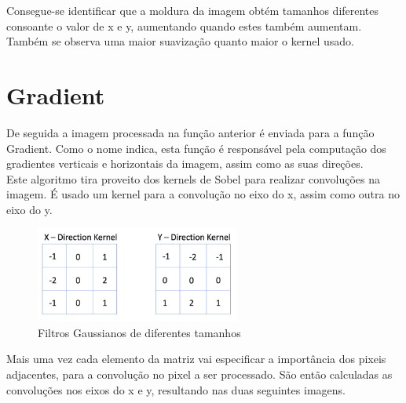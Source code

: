 \documentclass[a4paper]{report}
\begin{document}
Consegue-se identificar que a moldura da imagem obtém tamanhos diferentes consoante o valor de x e y, aumentando quando estes também aumentam. Também se observa uma maior suavização quanto maior o kernel usado.


\section{Gradient}
De seguida a imagem processada na função anterior é enviada para a função Gradient. Como o nome
indica, esta função é responsável pela computação dos gradientes verticais e horizontais da imagem,
assim como as suas direções.\\

Este algoritmo tira proveito dos kernels de Sobel para realizar convoluções na imagem. É usado um
kernel para a convolução no eixo do x, assim como outra no eixo do y.

\begin{figure}[H]
    \centering
        \includegraphics[width=0.6\textwidth]{images/Canny/SobelKernels.png}
        \caption{Filtros Gaussianos de diferentes tamanhos}
\end{figure}

 Mais uma vez cada elemento da matriz vai especificar a importância dos pixeis adjacentes, para a
 convolução no pixel a ser processado. São então calculadas as convoluções nos eixos do x e y,
 resultando nas duas seguintes imagens.
\end{document}
